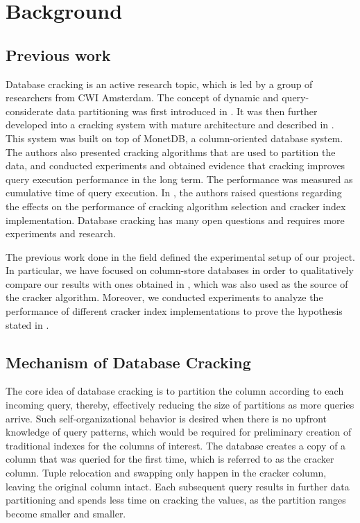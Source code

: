 \section{Background}
\label{sec:background}
\subsection{Previous work}
Database cracking is an active research topic, which is led by a group of researchers from CWI Amsterdam. The concept of dynamic and query-considerate data partitioning was first introduced in \cite{kersten_2005}. It was then further developed into a cracking system with mature architecture and described in \cite{idreos_2007}. This system was built on top of MonetDB, a column-oriented database system. The authors also presented cracking algorithms that are used to partition the data, and conducted experiments and obtained evidence that cracking improves query execution performance in the long term. The performance was measured as cumulative time of query execution. In \cite{schuhknecht_2014}, the authors raised questions regarding the effects on the performance of cracking algorithm selection and cracker index implementation. Database cracking has many open questions and requires more experiments and research.

The previous work done in the field defined the experimental setup of our project. In particular, we have focused on column-store databases in order to qualitatively compare our results with ones obtained in \cite{idreos_2007}, which was also used as the source of the cracker algorithm. Moreover, we conducted experiments to analyze the performance of different cracker index implementations to prove the hypothesis stated in \cite{schuhknecht_2014}.

\subsection{Mechanism of Database Cracking}
The core idea of database cracking is to partition the column according to each incoming query, thereby, effectively reducing the size of partitions as more queries arrive. Such self-organizational behavior is desired when there is no upfront knowledge of query patterns, which would be required for preliminary creation of traditional indexes for the columns of interest. The database creates a copy of a column that was queried for the first time, which is referred to as the cracker column. Tuple relocation and swapping only happen in the cracker column, leaving the original column intact. Each subsequent query results in further data partitioning and spends less time on cracking the values, as the partition ranges become smaller and smaller.


